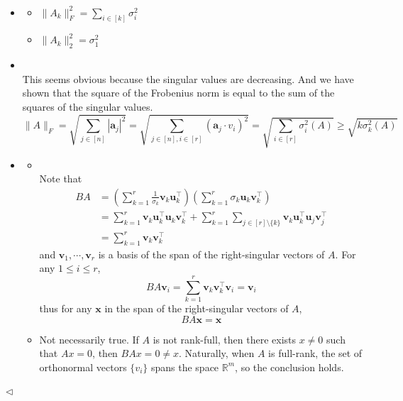 \documentclass[11pt]{article}
\newenvironment{answer}[1][Answer]{\begin{trivlist}
\item[\hskip \labelsep {\bfseries #1.}\hskip \labelsep]}{\hfill$\lhd$\end{trivlist}}
\begin{document}
\begin{answer} ~
\begin{itemize}
    \item [(1)] 
    \begin{itemize}
        \item [(a)] $\|A_k\|_F^2=\sum_{i\in [k]}\sigma_i^2$
        \item [(b)] $\|A_k\|_2^2=\sigma_1^2$
    \end{itemize}
    \item [(2)]              
\\This seems obvious because the singular values are decreasing. And we have shown that the square of the Frobenius norm is equal to the sum of the squares of the singular values.
$$\|A\|_F=\sqrt{\sum_{j\in [n]} |\boldsymbol{a}_j|^2}=\sqrt{\sum_{j\in [n],i\in [r]}(\boldsymbol{a}_j\cdot v_i)^2}=\sqrt{\sum_{i\in [r]}\sigma_i^2(A)}\ge\sqrt{k\sigma_k^2(A)}$$
    \item [(3)]
    \begin{itemize}
        \item [(a)] 
\\Note that
$$\begin{align*}
BA &= \left(\sum_{k=1}^r \frac{1}{\sigma_k}\boldsymbol{v}_k\boldsymbol{u}_k^\top \right)\left(\sum_{k=1}^r \sigma_k \boldsymbol{u}_k\boldsymbol{v}_k^\top \right)\\
&=\sum_{k=1}^r \boldsymbol{v}_k\boldsymbol{u}_k^\top \boldsymbol{u}_k\boldsymbol{v}_k^\top  + \sum_{k=1}^r\sum_{j\in [r]\setminus\{k\}}\boldsymbol{v}_k\boldsymbol{u}_k^\top \boldsymbol{u}_j\boldsymbol{v}_j^\top\\
&=\sum_{k=1}^r \boldsymbol{v}_k\boldsymbol{v}_k^\top
\end{align*}$$
and $\boldsymbol{v}_1,⋯,\boldsymbol{v}_r $ is a basis of the span of the right-singular vectors of $A$. For any $1\leq i\leq r$,
$$BA\boldsymbol{v}_i=\sum_{k=1}^r \boldsymbol{v}_k\boldsymbol{v}_k^\top \boldsymbol{v}_i=\boldsymbol{v}_i$$
thus for any $\boldsymbol{x}$ in the span of the right-singular vectors of $A$,
$$BA\boldsymbol{x}=\boldsymbol{x}$$
        \item [(b)] Not necessarily true. If $A$ is not rank-full, then there exists $x\neq 0$ such that $Ax=0$, then $BAx=0\neq x$. Naturally, when $A$ is full-rank, the set of orthonormal vectors $\{v_i\}$ spans the space $\mathbb{R}^m$, so the conclusion holds.
    \end{itemize}
\end{itemize}
\end{answer}
\end{document}
